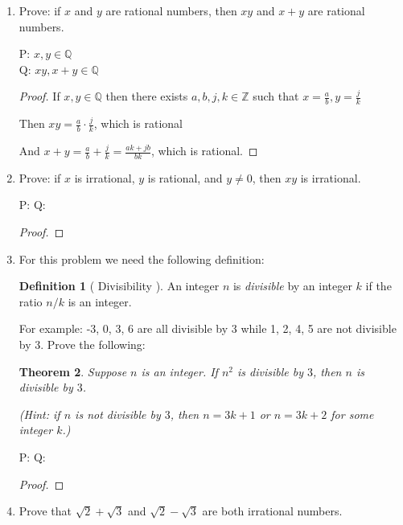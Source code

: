 \documentclass{article} %
\theoremstyle{plain}
\newtheorem*{theorem*}{Theorem}
\theoremstyle{definition}
\newtheorem*{definition*}{Definition}
\theoremstyle{case}
\begin{document}
\begin{enumerate}[label={\fbox{\textbf{Exercise \#\arabic* :}}}]
\begin{theorem*}
 \end{theorem*}

P: 
Q:

\begin{proof}
\end{proof} 

\newpage
\item Prove: if $x$ and $y$ are rational numbers, then $xy$ and $x+y$ are rational numbers. 

P: $x, y \in \mathbb{Q}$\\
Q: $xy, x+y \in \mathbb{Q}$

\begin{proof}

  If $x, y \in \mathbb{Q} $ then there exists $a,b,j,k \in \mathbb{Z} $
  such that $x = \frac{a}{b}, y = \frac{j}{k} $

  Then $xy = \frac{a}{b} \cdot \frac{j}{k}$, which is rational

  And $x+y = \frac{a}{b} + \frac{j}{k} = \frac{ak + jb}{bk} $, which is
  rational.
\end{proof} 

\newpage
\item Prove: if $x$ is irrational, $y$ is rational, and $y \neq 0$, then $xy$ is irrational. 


P: 
Q:

\begin{proof}
\end{proof} 

\newpage
\item For this problem we need the following definition: 
  \begin{definition*}[ Divisibility ]
    An integer $n$ is \emph{divisible} by an integer $k$ if the ratio $n/k$ is an integer. 
  \end{definition*}
  For example: -3, 0, 3, 6 are all divisible by 3 while 1, 2, 4, 5 are not divisible by 3.  Prove the following: 

\begin{theorem*} Suppose $n$ is an integer. If $n^2$ is divisible by $3$, then $n$ is divisible by $3$. 

\end{theorem*}
\emph{(Hint: if $n$ is not divisible by $3$, then $n=3k+1$ or $n=3k+2$ for some integer $k$.)}

P: 
Q:

\begin{proof}
\end{proof} 

\newpage
\item Prove that $\sqrt{2}+\sqrt{3}$ and $\sqrt{2}-\sqrt{3}$ are both  irrational numbers.


\end{enumerate}
\end{document}
